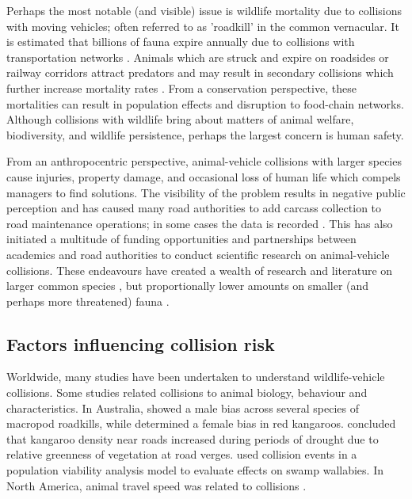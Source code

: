Perhaps the most notable (and visible) issue is wildlife mortality due to collisions with moving vehicles; often referred to as 'roadkill' in the common vernacular.  It is estimated that billions of fauna expire annually due to collisions with transportation networks \citep{seil06}.  Animals which are struck and expire on roadsides or railway corridors attract predators and may result in secondary collisions which further increase mortality rates \citep{spel98}.  From a conservation perspective, these mortalities can result in population effects and disruption to food-chain networks.  Although collisions with wildlife bring about matters of animal welfare, biodiversity, and wildlife persistence, perhaps the largest concern is human safety. 

From an anthropocentric perspective, animal-vehicle collisions with larger species cause injuries, property damage, and occasional loss of human life which compels managers to find solutions. The visibility of the problem results in negative public perception and has caused many road authorities to add carcass collection to road maintenance operations; in some cases the data is recorded \citep{huij07a}. This has also initiated a multitude of funding opportunities and partnerships between academics and road authorities to conduct scientific research on animal-vehicle collisions.  These endeavours have created a wealth of research and literature on larger common species \citep{biss08,clev01,romi96,sudh09}, but proportionally lower amounts on smaller (and perhaps more threatened) fauna \citep{clev03}.

\subsection{Factors influencing collision risk}

Worldwide, many studies have been undertaken to understand wildlife-vehicle collisions.  Some studies related collisions to animal biology, behaviour and characteristics.  In Australia, \cite{coul97} showed a male bias across several species of macropod roadkills, while \cite{kloc06} determined a female bias in red kangaroos.  \cite{lee04} concluded that kangaroo density near roads increased during periods of drought due to relative greenness of vegetation at road verges. \cite{ramp06} used collision events in a population viability analysis model to evaluate effects on swamp wallabies.  In North America, animal travel speed was related to collisions \citep{litv08}.

